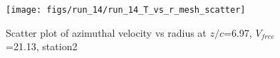 \begin{figure}[H]
\centering
\texttt{[image: figs/run\_14/run\_14\_T\_vs\_r\_mesh\_scatter]}
\caption{Scatter plot of azimuthal velocity vs radius at $z/c$=6.97, $V_{free}$=21.13, station2}
\label{fig:run_14_T_vs_r_mesh_scatter}
\end{figure}



